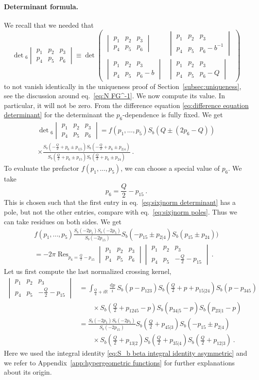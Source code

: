 \documentclass[12pt,a4paper]{article}
\newcommand{\be}{\begin{equation}}
\newcommand{\ee}{\end{equation}}
\renewcommand\d{\text{d}}
\newcommand\RR{\mathbb{R}}
\DeclareMathOperator*{\Res}{Res}
\newcommand{\sixjnorm}[6]{\begin{vmatrix}
#1 & #2 & #3 \\
#4 & #5 & #6
\end{vmatrix}
}
\begin{document}
\paragraph{Determinant formula.} We recall that we needed that 
\be 
\det\!{}_6 \sixjnorm{p_1}{p_2}{p_3}{p_4}{p_5}{p_6}\equiv \det\begin{pmatrix}
\sixjnorm{p_1}{p_2}{p_3}{p_4}{p_5}{p_6} & \sixjnorm{p_1}{p_2}{p_3}{p_4}{p_5}{p_6-b^{-1}} \\
\sixjnorm{p_1}{p_2}{p_3}{p_4}{p_5}{p_6-b } & \sixjnorm{p_1}{p_2}{p_3}{p_4}{p_5}{p_6-Q}
\end{pmatrix} \label{eq:sixjnorm determinant}
\ee
to not vanish identically in the uniqueness proof of Section~\ref{subsec:uniqueness}, see the discussion around eq.~\eqref{eq:N FG^-1}. We now compute its value. In particular, it will not be zero. From the difference equation \eqref{eq:difference equation determinant} for the determinant the $p_6$-dependence is fully fixed. We get
\begin{multline} 
\det\!{}_6 \sixjnorm{p_1}{p_2}{p_3}{p_4}{p_5}{p_6}=f(p_1,\dots,p_5) S_b(Q \pm (2p_6-Q)) \\
\times \frac{S_b(-\frac{Q}{2}+p_6 \pm p_{1|5})S_b(-\frac{Q}{2}+p_6 \pm p_{2|4})}{S_b(\frac{Q}{2}+p_6 \pm p_{15})S_b(\frac{Q}{2}+p_6 \pm p_{24})}\ .
\end{multline}
To evaluate the prefactor $f(p_1,\dots,p_5)$, we can choose a special value of $p_6$. We take 
\be 
p_6=\frac{Q}{2}-p_{15}\ .
\ee
This is chosen such that the first entry in eq.~\eqref{eq:sixjnorm determinant} has a pole, but not the other entries, compare with eq.~\eqref{eq:sixjnorm poles}. Thus we can take residues on both sides. We get
\begin{multline} 
f(p_1,\dots,p_5) \frac{S_b(-2p_1)S_b(-2p_5)}{S_b(-2p_{15})} S_b(-p_{15} \pm p_{2|4})S_b(p_{15} \pm p_{24}))\\
=-2\pi \Res_{p_6=\frac{Q}{2}-p_{15}} \sixjnorm{p_1}{p_2}{p_3}{p_4}{p_5}{p_6} \sixjnorm{p_1}{p_2}{p_3}{p_4}{p_5}{-\frac{Q}{2}-p_{15}}\ . \label{eq:residue compute f}
\end{multline}
Let us first compute the last normalized crossing kernel,
\begin{align}
    \sixjnorm{p_1}{p_2}{p_3}{p_4}{p_5}{-\frac{Q}{2}-p_{15}}&=\int_{\frac{Q}{4}+i \RR} \frac{\d p}{i}\  S_b(p-p_{123}) S_b(\tfrac{Q}{2}+p+p_{15|24}) S_b(p-p_{345}) \nonumber \\
    &\qquad\times S_b(\tfrac{Q}{2}+p_{1245}-p) S_b(p_{34|5}-p)S_b(p_{23|1}-p)\\
    &=\frac{S_b(-2p_1)S_b(-2p_5)}{S_b(-2p_{15})} S_b(\tfrac{Q}{2}+p_{45|3}) S_b(-p_{15} \pm p_{2|4}) \nonumber \\&\qquad\times S_b(\tfrac{Q}{2}+p_{13|2}) S_b(\tfrac{Q}{2}+p_{35|4})S_b(\tfrac{Q}{2}+p_{12|3})\ . \label{eq:value sixjnorm p6=-p15-Q/2}
\end{align}
Here we used the integral identity \eqref{eq:S_b beta integral identity asymmetric} and we refer to Appendix~\ref{app:hypergeometric functions} for further explanations about its origin.
\end{document}
